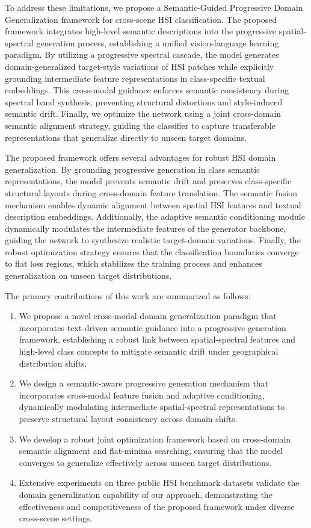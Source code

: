 To address these limitations, we propose a Semantic-Guided Progressive Domain Generalization framework for cross-scene HSI classification. The proposed framework integrates high-level semantic descriptions into the progressive spatial-spectral generation process, establishing a unified vision-language learning paradigm. By utilizing a progressive spectral cascade, the model generates domain-generalized target-style variations of HSI patches while explicitly grounding intermediate feature representations in class-specific textual embeddings. This cross-modal guidance enforces semantic consistency during spectral band synthesis, preventing structural distortions and style-induced semantic drift. Finally, we optimize the network using a joint cross-domain semantic alignment strategy, guiding the classifier to capture transferable representations that generalize directly to unseen target domains.

The proposed framework offers several advantages for robust HSI domain generalization. By grounding progressive generation in class semantic representations, the model prevents semantic drift and preserves class-specific structural layouts during cross-domain feature translation. The semantic fusion mechanism enables dynamic alignment between spatial HSI features and textual description embeddings. Additionally, the adaptive semantic conditioning module dynamically modulates the intermediate features of the generator backbone, guiding the network to synthesize realistic target-domain variations. Finally, the robust optimization strategy ensures that the classification boundaries converge to flat loss regions, which stabilizes the training process and enhances generalization on unseen target distributions.

The primary contributions of this work are summarized as follows:
\begin{enumerate}
    \item We propose a novel cross-modal domain generalization paradigm that incorporates text-driven semantic guidance into a progressive generation framework, establishing a robust link between spatial-spectral features and high-level class concepts to mitigate semantic drift under geographical distribution shifts.
    \item We design a semantic-aware progressive generation mechanism that incorporates cross-modal feature fusion and adaptive conditioning, dynamically modulating intermediate spatial-spectral representations to preserve structural layout consistency across domain shifts.
    \item We develop a robust joint optimization framework based on cross-domain semantic alignment and flat-minima searching, ensuring that the model converges to generalize effectively across unseen target distributions.
    \item Extensive experiments on three public HSI benchmark datasets validate the domain generalization capability of our approach, demonstrating the effectiveness and competitiveness of the proposed framework under diverse cross-scene settings.
\end{enumerate}
